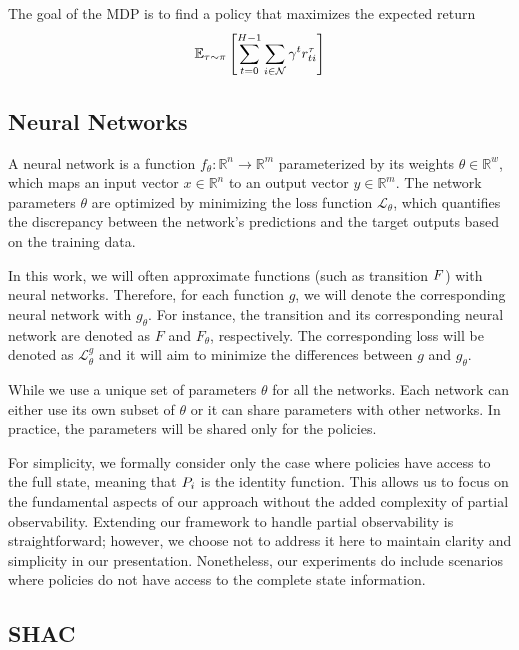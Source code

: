 The goal of the MDP is to find a policy that maximizes the expected return 
\[\mathbb{E}_{\tau\sim\pi}\left[\sum_{t=0}^{H-1}\sum_{i\in\mathcal{N}}\gamma^t r_{ti}^\tau \right]\]

\subsection{Neural Networks}
A neural network is a function $f_{\theta}:\mathbb{R}^n\rightarrow\mathbb{R}^m$ parameterized by its weights $\theta \in \mathbb{R}^w$, which maps an input vector $x\in\mathbb{R}^n$ to an output vector $y\in\mathbb{R}^m$. 
The network parameters $\theta$ are optimized by minimizing the loss function $\mathcal{L}_\theta$, which quantifies the discrepancy between the network's predictions and the target outputs based on the training data.

In this work, we will often approximate functions (such as transition $F$) with neural networks. Therefore, for each function $g$, we will denote the corresponding neural network with $g_\theta$. For instance, the transition and its corresponding neural network are denoted as $F$ and $F_{\theta}$, respectively. The corresponding loss will be denoted as $\mathcal{L}_\theta^g$ and it will aim to minimize the differences between $g$ and $g_\theta$.

While we use a unique set of parameters $\theta$ for all the networks. Each network can either use its own subset of $\theta$ or it can share parameters with other networks. In practice, the parameters will be shared only for the policies.

For simplicity, we formally consider only the case where policies have access to the full state, meaning that $P_{i}$ is the identity function. This allows us to focus on the fundamental aspects of our approach without the added complexity of partial observability. Extending our framework to handle partial observability is straightforward; however, we choose not to address it here to maintain clarity and simplicity in our presentation. Nonetheless, our experiments do include scenarios where policies do not have access to the complete state information.

\subsection{SHAC}


